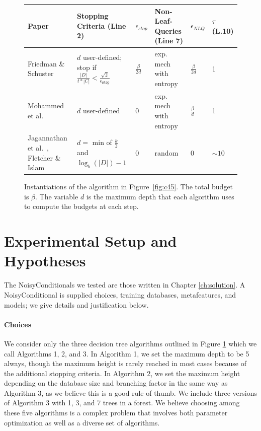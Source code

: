 \documentclass[11pt]{report}
\renewcommand{\t}[1]{\texttt{#1}}
\begin{document}
\begin{figure}
\begin{center}
\begin{tabular}{|p{2cm}|p{3cm}|l|p{3cm}|l|p{1cm}|}
\hline
Paper & Stopping Criteria (Line 2) & $\epsilon_{stop}$ & Non-Leaf-Queries (Line 7) & $\epsilon_{NLQ}$ & $\tau$ (L.10) \\ \hline
Friedman \& Schuster~\cite{Friedman:2010} & $d$ user-defined; stop if $\frac{|D|}{t*|C|} < \frac{\sqrt{2}}{\epsilon_{\t{stop}}}$ & $\frac{\beta}{2d}$ & exp. mech with entropy& $\frac{\beta}{2d}$ & 1 \\ \hline
Mohammed et al.~\cite{Mohammed:2015} & $d$ user-defined & 0 & exp. mech with entropy & $\frac{\beta}{d}$ & 1 \\ \hline
Jagannathan et al.~\cite{Jagannathan:2009}, Fletcher \& Islam~\cite{Fletcher:2015} & $d=$ min of $\frac{k}{2}$ and $\log_b(|D|)-1$ & 0 & random & 0 & $\sim 10$ \\ \hline
\end{tabular}
\end{center}
\caption{Instantiations of the algorithm in Figure~\ref{fig:c45}. The total budget is $\beta$. The variable $d$ is the maximum depth that each algorithm uses to compute the budgets at each step.}\label{fig:algtable}
\end{figure}

\section{Experimental Setup and Hypotheses}
The NoisyConditionals we tested are those written in Chapter \ref{ch:solution}. A NoisyConditional is supplied choices, training databases, metafeatures, and models; we give details and justification below.
\paragraph{Choices} We consider only the three decision tree algorithms outlined in Figure \ref{fig:algtable} which we call Algorithms 1, 2, and 3. In Algorithm 1, we set the maximum depth to be 5 always, though the maximum height is rarely reached in most cases because of the additional stopping criteria. In Algorithm 2, we set the maximum height depending on the database size and branching factor in the same way as Algorithm 3, as we believe this is a good rule of thumb. We include three versions of Algorithm 3 with 1, 3, and 7 trees in a forest. We believe choosing among these five algorithms is a complex problem that involves both parameter optimization as well as a diverse set of algorithms.
\end{document}
